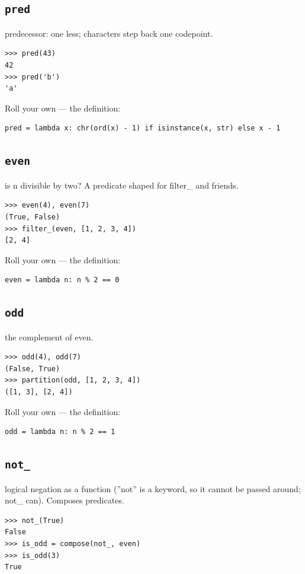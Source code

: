 \documentclass[10pt,letterpaper]{book}
\begin{document}
\subsection{\texttt{pred}}\label{def:pred}
predecessor: one less; characters step back one codepoint.
\begin{lstlisting}[style=ex]
>>> pred(43)
42
>>> pred('b')
'a'
\end{lstlisting}

Roll your own --- the definition:

\begin{lstlisting}[style=ex]
pred = lambda x: chr(ord(x) - 1) if isinstance(x, str) else x - 1
\end{lstlisting}
\subsection{\texttt{even}}\label{def:even}
is n divisible by two? A predicate shaped for filter\_ and friends.
\begin{lstlisting}[style=ex]
>>> even(4), even(7)
(True, False)
>>> filter_(even, [1, 2, 3, 4])
[2, 4]
\end{lstlisting}

Roll your own --- the definition:

\begin{lstlisting}[style=ex]
even = lambda n: n % 2 == 0
\end{lstlisting}

\subsection{\texttt{odd}}\label{def:odd}
the complement of even.
\begin{lstlisting}[style=ex]
>>> odd(4), odd(7)
(False, True)
>>> partition(odd, [1, 2, 3, 4])
([1, 3], [2, 4])
\end{lstlisting}

Roll your own --- the definition:

\begin{lstlisting}[style=ex]
odd = lambda n: n % 2 == 1
\end{lstlisting}

\subsection{\texttt{not\_}}\label{def:not-}
logical negation as a function (''not'' is a keyword, so it cannot be passed around; not\_ can). Composes predicates.
\begin{lstlisting}[style=ex]
>>> not_(True)
False
>>> is_odd = compose(not_, even)
>>> is_odd(3)
True
\end{lstlisting}
\end{document}
